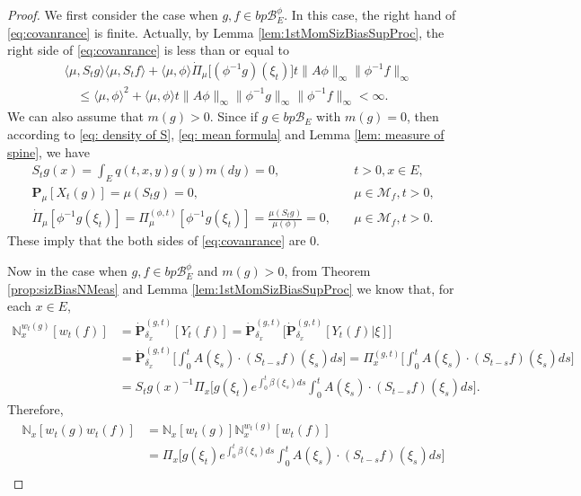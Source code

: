 \documentclass[UTF8]{pkuthss}
\theoremstyle{plain}
\theoremstyle{definition}
\numberwithin{equation}{section}
\begin{document}
\begin{proof}
	We first consider the case when $g,f\in bp\mathscr B^\phi_E$.
	In this case, the right hand of \eqref{eq:covanrance} is finite.
	Actually,
	by Lemma \ref{lem:1stMomSizBiasSupProc},
	the right side of \eqref{eq:covanrance} is less than or equal to
\begin{align}
	&\langle \mu, S_tg \rangle \langle\mu,S_t f \rangle +
\langle \mu,\phi\rangle\dot{\Pi}_\mu\big[(\phi^{-1}g)(\xi_t)\big] t \|A\phi\|_\infty \|\phi^{-1}f\|_\infty\\
	&\quad \leq \langle \mu,\phi \rangle^2 + \langle \mu,\phi\rangle t \|A\phi\|_\infty \|\phi^{-1}g\|_\infty\|\phi^{-1}f\|_\infty
	< \infty.
\end{align}
	We can also assume that $m(g)>0$.
 Since if $g\in bp\mathscr B_E$ with $m(g)=0$, then according to \eqref{eq: density of S}, \eqref{eq: mean formula} and Lemma \ref{lem: measure of spine}, we have
\begin{align}
	S_t g(x) = \int_{E} q(t,x,y) g(y)m(dy) = 0,
	&\quad t > 0, x\in E,
	\\\mathbf P_\mu [X_t(g)] = \mu(S_t g)  = 0,
	&\quad \mu \in \mathcal M_f, t>0,
	\\\dot{\Pi}_\mu [\phi^{-1}g(\xi_t)] = \Pi_\mu^{(\phi,t)}[\phi^{-1}g(\xi_t)]
	= \frac{\mu(S_t g)}{\mu(\phi)}
	= 0,
	&\quad \mu \in \mathcal M_f, t>0.
\end{align}
These imply that the both sides of \eqref{eq:covanrance} are $0$.
\par
	Now in the case when $g,f\in bp\mathscr B^\phi_E$ and $m(g)>0$, from
    Theorem \ref{prop:sizBiasNMeas} and
	Lemma \ref{lem:1stMomSizBiasSupProc} we know that, for each $x\in E$,
\begin{align}
	\mathbb N_x^{w_t(g)}[w_t(f)]
	&= \dot{\mathbf P}_{\delta_x}^{(g,t)}[Y_t(f)]
	= \dot{\mathbf P}_{\delta_x}^{(g,t)} \big[\dot{\mathbf P}_{\delta_x}^{(g,t)}[Y_t(f) | \xi]\big]\\
	&= \dot{\mathbf P}_{\delta_x}^{(g,t)} \Big[\int_0^t  A(\xi_s) \cdot (S_{t-s}  f)(\xi_s) ds\Big]
	= \Pi_x^{(g,t)} \Big[\int_0^t  A (\xi_s)\cdot (S_{t-s} f)(\xi_s) ds\Big]\\
	&= S_t g(x)^{-1} \Pi_{x} \Big[g(\xi_t) e^{\int_0^t \beta(\xi_s) ds} \int_0^t A(\xi_s)\cdot (S_{t-s} f)(\xi_s) ds\Big].
\end{align}
	Therefore,
\begin{align}
	\mathbb N_x[w_t(g) w_t( f)]
	&= \mathbb N_x[w_t(g)] \mathbb N_x^{w_t(g)}[w_t(f)]\\
	&= \Pi_x \Big[g(\xi_t) e^{\int_0^t \beta(\xi_s) ds} \int_0^t A(\xi_s)\cdot (S_{t-s} f)(\xi_s) ds\Big]\\

\end{align}
\end{proof}
\end{document}
